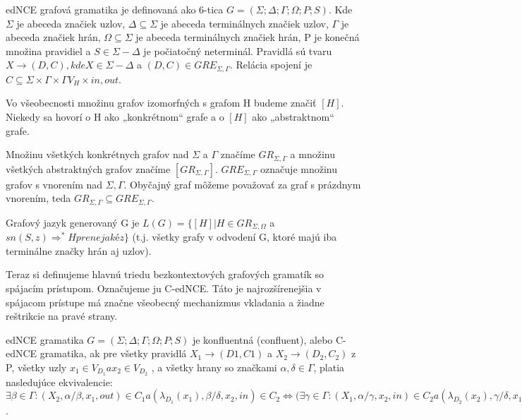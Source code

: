 \begin{defin}
edNCE grafová gramatika je definovaná ako 6-tica 
$G =(\Sigma ;\Delta ;\Gamma ;\Omega ; P; S)$. 
Kde $\Sigma $  je abeceda značiek uzlov, 
$\Delta  \subseteq  \Sigma $ je abeceda terminálnych značiek uzlov, 
$\Gamma $ je abeceda značiek hrán, 
$\Omega \subseteq  \Sigma $  je abeceda terminálnych
značiek hrán, P je konečná množina pravidiel a $S \in  \Sigma - \Delta $ je
počiatočný neterminál. Pravidlá sú tvaru $X \to (D,C), kde X \in  \Sigma - \Delta $ a
$(D,C) \in  GRE_{\Sigma ,\Gamma }$. Relácia spojení je 
$C \subseteq  \Sigma \times \Gamma \times \Gamma V_H \times {in,out}$.
\end{defin}

Vo všeobecnosti množinu grafov izomorfných s grafom H budeme značiť
$[ H ] $. Niekedy sa hovorí o H ako „konkrétnom“ grafe a o $[ H ]$ ako „abstraktnom“
grafe.

\begin{defin}
Množinu všetkých konkrétnych grafov nad $\Sigma$ a $\Gamma $ značíme
$GR_{\Sigma ,\Gamma }$ a množinu všetkých abstraktných grafov značíme 
$[GR_{\Sigma ,\Gamma }]$. $GRE_{\Sigma ,\Gamma }$ označuje množinu grafov 
s vnorením nad $\Sigma ,\Gamma $. Obyčajný graf môžeme považovať
za graf s prázdnym vnorením, teda $GR_{\Sigma ,\Gamma } 
\subseteq GRE_{\Sigma ,\Gamma }$.
\end{defin}

\begin{defin}
Grafový jazyk generovaný G je $L(G) = \{[H] | H \in GR_{\Sigma ,\Omega }$ 
a $sn(S,z) \Rightarrow ^* H pre nejaké z \} $
(t.j. všetky grafy v odvodení G, ktoré majú iba terminálne značky hrán aj uzlov).
\end{defin}

Teraz si definujeme hlavnú triedu bezkontextových grafových gramatík so
spájacím prístupom. Označujeme ju C-edNCE. Táto je najrozšírenejšia v
spájacom prístupe má značne všeobecný mechanizmus vkladania a žiadne
reštrikcie na pravé strany.

\begin{defin}
edNCE gramatika $G =(\Sigma ;\Delta ;\Gamma ;\Omega ; P; S)$ je konfluentná
(confluent), alebo C-edNCE gramatika, ak pre všetky pravidlá $X_1 \to (D1,C1)$
a $X_2 \to (D_2,C_2)$ z P, všetky uzly $x_1 \in V_{D_1} a x_2 \in V_{D_2}$ , a všetky hrany so
značkami $\alpha ,\delta \in \Gamma $, platia nasledujúce ekvivalencie:
$\exists \beta \in \Gamma  : (X_2, \alpha /\beta , x_1, out) \in C_1 a (\lambda _{D_1}(x_1), \beta /\delta , x_2, in) \in C_2
\Leftrightarrow 
( \exists \gamma \in \Gamma  : (X_1, \alpha /\gamma , x_2, in) \in C_2 a (\lambda _{D_2}(x_2),\gamma /\delta , x_1, out) \in C_1$.
\end{defin}

